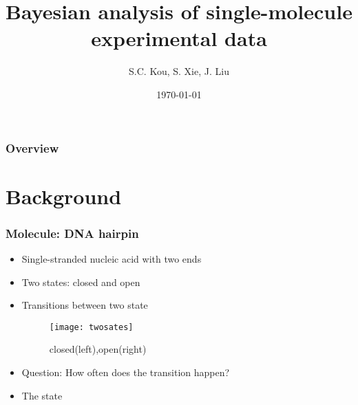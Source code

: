 \documentclass[11pt]{beamer}
\title{Bayesian analysis of single-molecule experimental data}
\author{\large  S.C. Kou, S. Xie, J. Liu}
\institute{\large Mingwei Tang}
\date{\today}
\newcommand{\bit}{\begin{itemize}\setlength{\itemsep}{0cm}\setlength{\topsep}{0cm}}
\newcommand{\eit}{\end{itemize}}
\begin{document}
  \maketitle
\begin{frame}
	\frametitle{Overview} %
	\tableofcontents %
\end{frame}
\section{Background}
\begin{frame}
\frametitle{Molecule: DNA hairpin}
\bit
\item Single-stranded nucleic acid with two ends
\item Two states: closed and open
\item Transitions between two state
\begin{figure}[H]
  \centering
      \texttt{[image: twosates]}
      \caption{closed(left),open(right)}
\end{figure}

\pause
\item Question: How often does the transition happen? 
\item The state  {\color{red}{can not be observed}}
\eit
 \end{frame}
\end{document}
